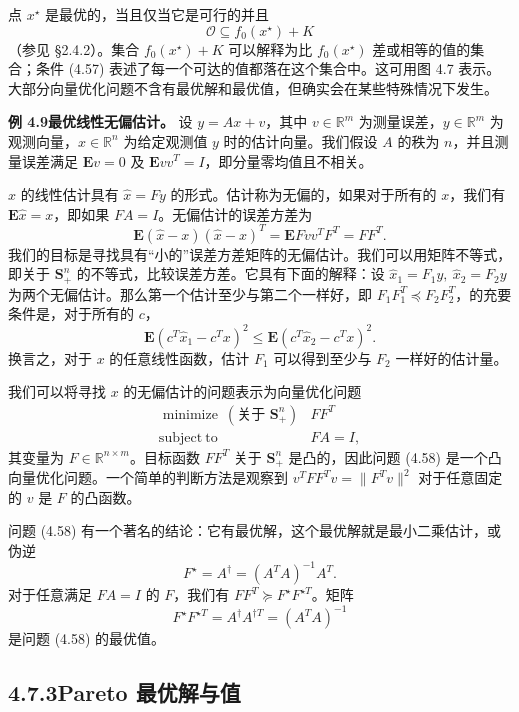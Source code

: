 \documentclass[UTF8, 12pt, fontset=fandol, oneside]{ctexart}
\begin{document}
点 $x^\star$ 是最优的，当且仅当它是可行的并且
\begin{equation}
\mathcal{O}\subseteq f_0(x^\star)+K
\tag{4.57}
\end{equation}
（参见 \S 2.4.2）。集合 $f_0(x^\star)+K$ 可以解释为比 $f_0(x^\star)$ 差或相等的值的集合；条件 (4.57) 表述了每一个可达的值都落在这个集合中。这可用图 4.7 表示。大部分向量优化问题不含有最优解和最优值，但确实会在某些特殊情况下发生。

\noindent\textbf{例 4.9\quad 最优线性无偏估计。}\quad
设 $y=Ax+v$，其中 $v\in\mathbb{R}^m$ 为测量误差，$y\in\mathbb{R}^m$ 为观测向量，$x\in\mathbb{R}^n$ 为给定观测值 $y$ 时的估计向量。我们假设 $A$ 的秩为 $n$，并且测量误差满足 $\mathbf{E}v=0$ 及 $\mathbf{E}vv^T=I$，即分量零均值且不相关。

$x$ 的线性估计具有 $\hat{x}=Fy$ 的形式。估计称为无偏的，如果对于所有的 $x$，我们有 $\mathbf{E}\hat{x}=x$，即如果 $FA=I$。无偏估计的误差方差为
\[
\mathbf{E}(\hat{x}-x)(\hat{x}-x)^T=\mathbf{E}Fvv^TF^T=FF^T.
\]
我们的目标是寻找具有“小的”误差方差矩阵的无偏估计。我们可以用矩阵不等式，即关于 $\mathbf{S}_+^n$ 的不等式，比较误差方差。它具有下面的解释：设 $\hat{x}_1=F_1y,\ \hat{x}_2=F_2y$ 为两个无偏估计。那么第一个估计至少与第二个一样好，即 $F_1F_1^T\preceq F_2F_2^T$，的充要条件是，对于所有的 $c$，
\[
\mathbf{E}(c^T\hat{x}_1-c^Tx)^2\leq \mathbf{E}(c^T\hat{x}_2-c^Tx)^2.
\]
换言之，对于 $x$ 的任意线性函数，估计 $F_1$ 可以得到至少与 $F_2$ 一样好的估计量。

我们可以将寻找 $x$ 的无偏估计的问题表示为向量优化问题
\begin{equation}
\begin{array}{ll}
\mathop{\mathrm{minimize}}\ (\text{关于 }\mathbf{S}_+^n) & FF^T\\
\mathrm{subject\ to} & FA=I,
\end{array}
\tag{4.58}
\end{equation}
其变量为 $F\in\mathbb{R}^{n\times m}$。目标函数 $FF^T$ 关于 $\mathbf{S}_+^n$ 是凸的，因此问题 (4.58) 是一个凸向量优化问题。一个简单的判断方法是观察到 $v^TFF^Tv=\|F^Tv\|^2$ 对于任意固定的 $v$ 是 $F$ 的凸函数。

问题 (4.58) 有一个著名的结论：它有最优解，这个最优解就是最小二乘估计，或伪逆
\[
F^\star=A^\dagger=(A^TA)^{-1}A^T.
\]
对于任意满足 $FA=I$ 的 $F$，我们有 $FF^T\succeq F^\star F^{\star T}$。矩阵
\[
F^\star F^{\star T}=A^\dagger A^{\dagger T}=(A^TA)^{-1}
\]
是问题 (4.58) 的最优值。

\subsection*{4.7.3\quad Pareto 最优解与值}
\end{document}
